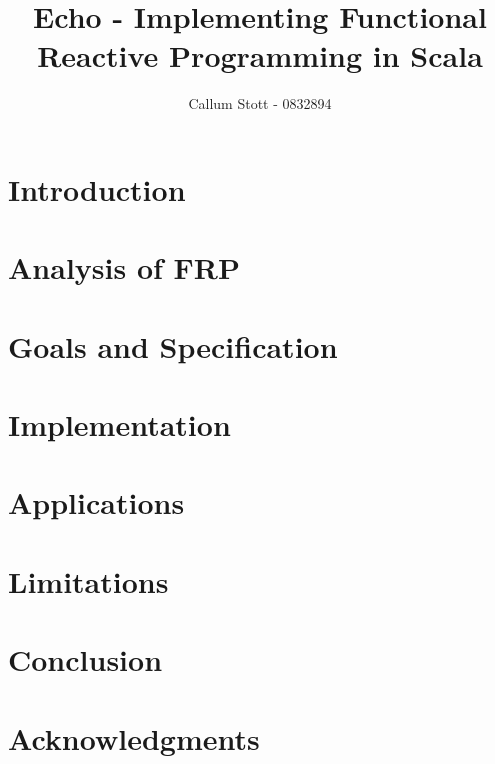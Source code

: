 \documentclass{article}
\begin{document}
  \title{Echo - Implementing Functional Reactive Programming in Scala}
  \author{Callum Stott - 0832894}
  \maketitle
  \newpage
  \twocolumn
  \section{Introduction}
  \section{Analysis of FRP}
  \section{Goals and Specification}
  \section{Implementation}
  \section{Applications}
  \section{Limitations}
  \section{Conclusion}
  \section{Acknowledgments} 
\end{document}

